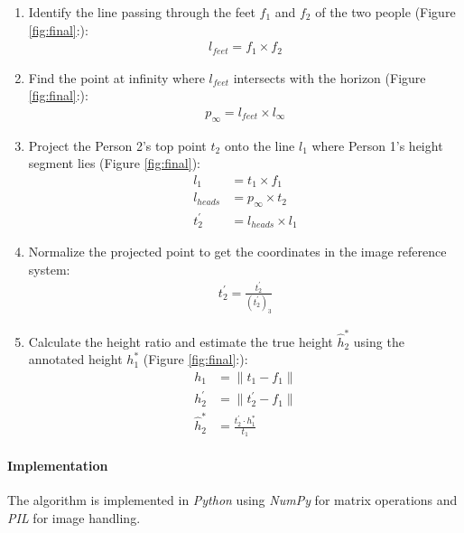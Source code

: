 \begin{enumerate}
    \item Identify the line passing through the feet $f_1$ and $f_2$ of the two people (Figure \ref{fig:final}:):
    \begin{align*}
        l_{feet} = f_{1} \times f_{2}
    \end{align*}
    
    \item Find the point at infinity where $l_{feet}$ intersects with the horizon (Figure \ref{fig:final}:):
    \begin{align*}
        p_{\infty} = l_{feet} \times l_{\infty}
    \end{align*}

    \vspace{5mm}

    \item Project the Person 2's top point $t_2$ onto the line $l_1$ where Person 1's height segment lies (Figure \ref{fig:final}):
    \begin{align*}
        l_{1} &= t_1 \times f_1 \\
        l_{heads} &= p_{\infty} \times t_2 \\
        t_2^{\prime} &= l_{heads} \times l_{1}
    \end{align*}

    \item Normalize the projected point to get the coordinates in the image reference system:
    \begin{align*}
        t_2^{\prime} = \frac{t_2^{\prime}}{(t_2^{\prime})_3}
    \end{align*}

    \item Calculate the height ratio and estimate the true height $\hat{h}^*_2$ using the annotated height $h^*_1$ (Figure \ref{fig:final}:):
    \begin{align*}
        h_1 &= \|t_1 - f_1\| \\
        h_2^{\prime} &= \|t_2^{\prime} - f_1\| \\
        \hat{h}^*_2 &= \frac{t_2^{\prime} \cdot h^*_1}{t_1}
    \end{align*}
    
\end{enumerate}

\paragraph{Implementation} The algorithm is implemented in \textit{Python} using \textit{NumPy} for matrix operations and \textit{PIL} for image handling.

